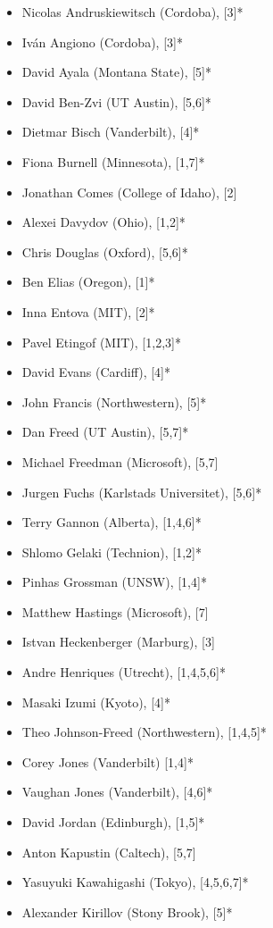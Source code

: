 \documentclass[12pt]{article}
\begin{document}
\begin{multicols}{2}
\begin{itemize}
  \setlength{\itemsep}{1pt}
  \setlength{\parskip}{0pt}
  \setlength{\parsep}{0pt}
\item Nicolas Andruskiewitsch (Cordoba), [3]*
\item Iv\'an Angiono (Cordoba), [3]*
\item David Ayala (Montana State), [5]*
\item David Ben-Zvi (UT Austin), [5,6]*
\item Dietmar Bisch (Vanderbilt), [4]*
\item Fiona Burnell (Minnesota), [1,7]*
\item Jonathan Comes (College of Idaho), [2]
\item Alexei Davydov (Ohio), [1,2]*
\item Chris Douglas (Oxford), [5,6]*
\item Ben Elias (Oregon), [1]*
\item Inna Entova (MIT), [2]*
\item Pavel Etingof (MIT), [1,2,3]*
\item David Evans (Cardiff), [4]*
\item John Francis (Northwestern), [5]*
\item Dan Freed (UT Austin), [5,7]*
\item Michael Freedman (Microsoft), [5,7]
\item Jurgen Fuchs (Karlstads Universitet), [5,6]*
\item Terry Gannon (Alberta), [1,4,6]*
\item Shlomo Gelaki (Technion), [1,2]*
\item Pinhas Grossman (UNSW), [1,4]*
\item Matthew Hastings (Microsoft), [7]
\item Istvan Heckenberger (Marburg), [3]
\item Andre Henriques (Utrecht), [1,4,5,6]*
\item Masaki Izumi (Kyoto), [4]*
\item Theo Johnson-Freed (Northwestern), [1,4,5]*
\item Corey Jones (Vanderbilt) [1,4]*
\item Vaughan Jones (Vanderbilt), [4,6]*
\item David Jordan (Edinburgh), [1,5]*
\item Anton Kapustin (Caltech), [5,7]
\item Yasuyuki Kawahigashi (Tokyo), [4,5,6,7]*
\item Alexander Kirillov (Stony Brook), [5]*

\end{itemize}
\end{multicols}
\end{document}
